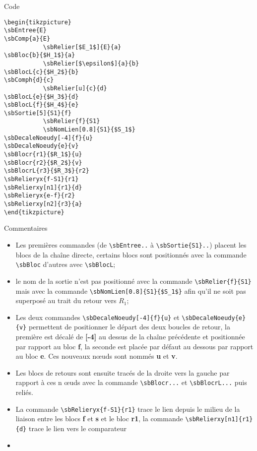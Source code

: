 \documentclass[a4paper,11pt]{article}                      %
\begin{document}
\begin{minipage}[t]{0.46\linewidth}
Code
\begin{verbatim}
\begin{tikzpicture}
\sbEntree{E}
\sbComp{a}{E}
           \sbRelier[$E_1$]{E}{a}
\sbBloc{b}{$H_1$}{a}
           \sbRelier[$\epsilon$]{a}{b}
\sbBlocL{c}{$H_2$}{b}
\sbComph{d}{c}
           \sbRelier[u]{c}{d}
\sbBlocL{e}{$H_3$}{d}
\sbBlocL{f}{$H_4$}{e}
\sbSortie[5]{S1}{f}
           \sbRelier{f}{S1}
           \sbNomLien[0.8]{S1}{$S_1$}
\sbDecaleNoeudy[-4]{f}{u}
\sbDecaleNoeudy{e}{v}
\sbBlocr{r1}{$R_1$}{u}
\sbBlocr{r2}{$R_2$}{v}
\sbBlocrL{r3}{$R_3$}{r2}
\sbRelieryx{f-S1}{r1}
\sbRelierxy[n1]{r1}{d}
\sbRelieryx{e-f}{r2}
\sbRelierxy[n2]{r3}{a}
\end{tikzpicture}
\end{verbatim}
\end{minipage}
\begin{minipage}[t]{0.46\linewidth}
Commentaires
\begin{itemize}
    \item Les premières commandes (de \verb"\sbEntree.." à \verb"\sbSortie{S1}..") placent les blocs de la chaîne directe, certains blocs sont positionnés avec la commande \verb"\sbBloc"  d'autres avec \verb"\sbBlocL";
    \item le nom de la sortie n'est pas positionné avec la commande \verb"\sbRelier{f}{S1}"  mais avec la commande \verb"\sbNomLien[0.8]{S1}{$S_1$}" afin qu'il ne soit pas superposé au trait du retour vers $R_1$;
    \item Les deux commandes \verb"\sbDecaleNoeudy[-4]{f}{u}" et \verb"\sbDecaleNoeudy{e}{v}" permettent de positionner le départ des deux boucles de retour, la première est décalé de \textbf{[-4]} au dessus de la chaîne précédente et positionnée par rapport au bloc \textbf{f}, la seconde est placée par défaut au dessous par rapport au bloc \textbf{e}. Ces nouveaux n\oe uds sont nommés \textbf{u} et \textbf{v}.
    \item Les blocs de retours sont ensuite tracés de la droite vers la gauche par rapport à ces n \oe uds avec la commande \verb"\sbBlocr..." et \verb"\sbBlocrL..." puis reliés.
    \item La commande \verb"\sbRelieryx{f-S1}{r1}" trace le lien depuis le milieu de la liaison entre les blocs \textbf{f} et \textbf{s} et le bloc \textbf{r1}, la commande \verb"\sbRelierxy[n1]{r1}{d}" trace le lien vers le comparateur 
    \item 
\end{itemize}
\end{minipage}
\end{document}
